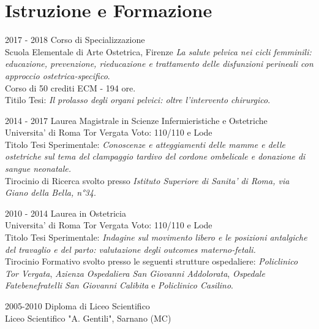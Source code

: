 \documentclass[11pt]{friggeri-cv}
\begin{document}
\vspace{-10pt}
\section{Istruzione e Formazione}
\begin{entrylist}
  \entry
  {2017 - 2018}
  {Corso di Specializzazione}
  {\\Scuola Elementale di Arte Ostetrica, Firenze}
  {\emph{La salute pelvica nei cicli femminili: educazione, prevenzione, 
    rieducazione e trattamento delle disfunzioni perineali con approccio 
    ostetrica-specifico}. \\
    Corso di 50 crediti ECM - 194 ore.\\ 
    Titilo Tesi: \emph{Il prolasso degli organi pelvici: oltre l’intervento 
    chirurgico}.\\
  }

  \entry
  {2014 - 2017}
  {Laurea Magistrale in Scienze Infermieristiche e Ostetriche}
  {\\Universita' di Roma Tor Vergata}
  {Voto: 110/110 e Lode\\ Titolo Tesi Sperimentale: \emph{Conoscenze e 
    atteggiamenti delle mamme e delle ostetriche sul tema del clampaggio 
    tardivo del cordone ombelicale e donazione di sangue neonatale.} 
    \\Tirocinio di Ricerca svolto presso \textit{Istituto Superiore di Sanita' 
    di Roma, via Giano della Bella, n°34}.\\
  }
  
  \entry
  {2010 - 2014}
  {Laurea in Ostetricia}
  {\\Universita' di Roma Tor Vergata}
  {Voto: 110/110 e Lode\\
    Titolo Tesi Sperimentale: \emph{Indagine sul movimento libero e le 
    posizioni 
    antalgiche del travaglio e del parto: valutazione degli outcomes 
    materno-fetali.} \\
    Tirocinio Formativo svolto presso le seguenti strutture ospedaliere: 
    \textit{Policlinico Tor 
    Vergata}, \textit{Azienza Ospedaliera San Giovanni Addolorata}, 
    \textit{Ospedale Fatebenefratelli San Giovanni Calibita} e 
    \textit{Policlinico 
    Casilino}.\\
  }
  
  \entry
  {2005-2010}
  {Diploma di Liceo Scientifico}
  {\\Liceo Scientifico "A. Gentili", Sarnano (MC)}
  {\\}
\end{entrylist}
\end{document}
